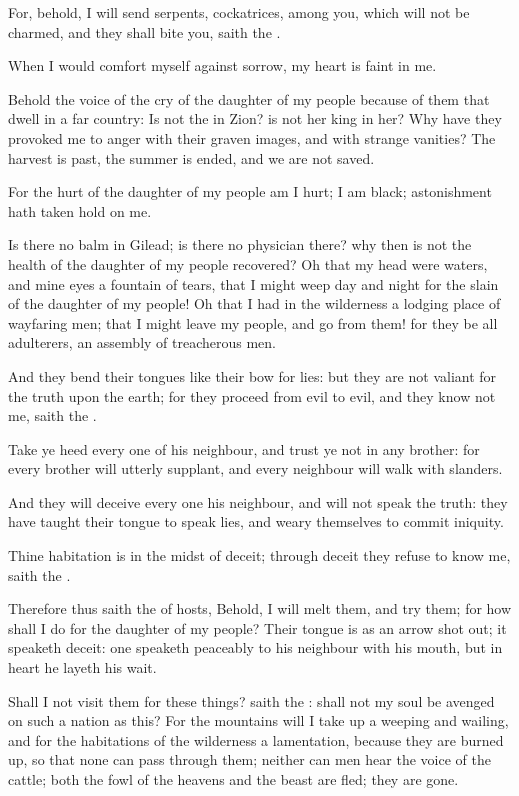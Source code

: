\Verse For, behold, I will send serpents, cockatrices, among you, which will not be charmed, and they shall bite you, saith the \LORD.

\Verse When I would comfort myself against sorrow, my heart is faint in me.

\Verse Behold the voice of the cry of the daughter of my people because of them that dwell in a far country: Is not the \LORD in Zion? is not her king in her? Why have they provoked me to anger with their graven images, and with strange vanities?  \Verse The harvest is past, the summer is ended, and we are not saved.

\Verse For the hurt of the daughter of my people am I hurt; I am black; astonishment hath taken hold on me.

\Verse Is there no balm in Gilead; is there no physician there? why then is not the health of the daughter of my people recovered?  
\Chapter
\Verse Oh that my head were waters, and mine eyes a fountain of tears, that I might weep day and night for the slain of the daughter of my people!  \Verse Oh that I had in the wilderness a lodging place of wayfaring men; that I might leave my people, and go from them! for they be all adulterers, an assembly of treacherous men.

\Verse And they bend their tongues like their bow for lies: but they are not valiant for the truth upon the earth; for they proceed from evil to evil, and they know not me, saith the \LORD.

\Verse Take ye heed every one of his neighbour, and trust ye not in any brother: for every brother will utterly supplant, and every neighbour will walk with slanders.

\Verse And they will deceive every one his neighbour, and will not speak the truth: they have taught their tongue to speak lies, and weary themselves to commit iniquity.

\Verse Thine habitation is in the midst of deceit; through deceit they refuse to know me, saith the \LORD.

\Verse Therefore thus saith the \LORD of hosts, Behold, I will melt them, and try them; for how shall I do for the daughter of my people?  \Verse Their tongue is as an arrow shot out; it speaketh deceit: one speaketh peaceably to his neighbour with his mouth, but in heart he layeth his wait.

\Verse Shall I not visit them for these things? saith the \LORD: shall not my soul be avenged on such a nation as this?  \Verse For the mountains will I take up a weeping and wailing, and for the habitations of the wilderness a lamentation, because they are burned up, so that none can pass through them; neither can men hear the voice of the cattle; both the fowl of the heavens and the beast are fled; they are gone.

